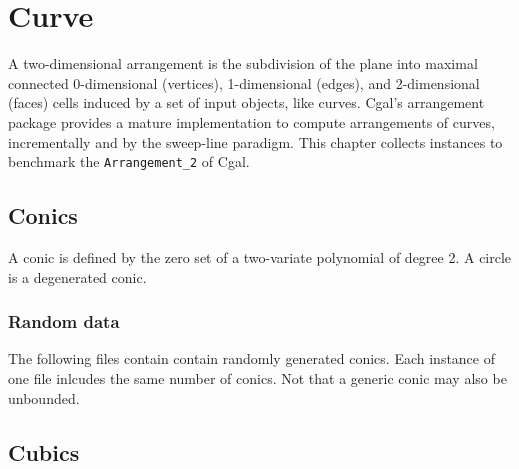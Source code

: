 \section{Curve\label{bi_cha:Curve}}

A two-dimensional arrangement is the subdivision of the plane into
maximal connected 0-dimensional (vertices), 1-dimensional (edges), 
and 2-dimensional (faces) cells induced by a set of input objects, like
curves. {\sc Cgal}'s arrangement package provides a mature implementation
to compute arrangements of curves, incrementally and by the sweep-line
paradigm. This chapter collects instances to benchmark the 
{\tt Arrangement\_2} of {\sc Cgal}.

\subsection{Conics\label{bi_sec:Arrangement2Conics}}

A conic is defined by the zero set of a two-variate polynomial
of degree 2. A circle is a degenerated conic.

\subsubsection{Random data\label{bi_sec:Arrangement2ConicsRandomdata}}

The following files contain contain randomly generated conics. 
Each instance of one file inlcudes the same number of conics. Not that
a generic conic may also be unbounded.


\subsection{Cubics}

